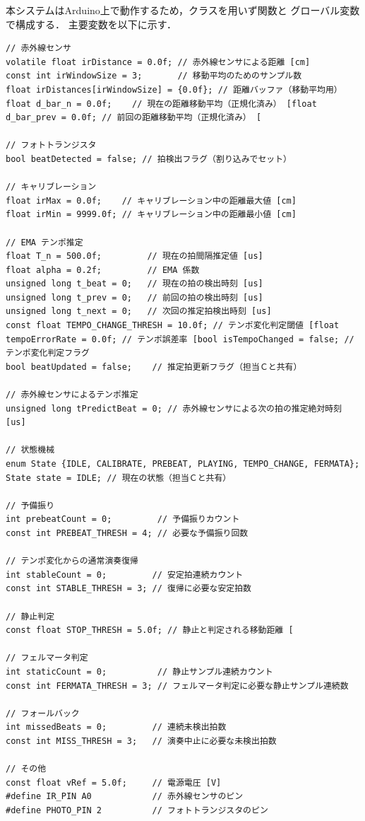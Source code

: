 \documentclass[lualatex,book,paper=a4paper,jafontsize=11.5pt,jafontscale=1.05,oneside]{jlreq}
\begin{document}
本システムはArduino上で動作するため，クラスを用いず関数と
グローバル変数で構成する．
主要変数を以下に示す．

\begin{lstlisting}[caption=担当 B 主要変数]
// 赤外線センサ
volatile float irDistance = 0.0f; // 赤外線センサによる距離 [cm]
const int irWindowSize = 3;       // 移動平均のためのサンプル数
float irDistances[irWindowSize] = {0.0f}; // 距離バッファ（移動平均用）
float d_bar_n = 0.0f;    // 現在の距離移動平均（正規化済み） [float d_bar_prev = 0.0f; // 前回の距離移動平均（正規化済み） [

// フォトトランジスタ
bool beatDetected = false; // 拍検出フラグ（割り込みでセット）

// キャリブレーション
float irMax = 0.0f;    // キャリブレーション中の距離最大値 [cm]
float irMin = 9999.0f; // キャリブレーション中の距離最小値 [cm]

// EMA テンポ推定
float T_n = 500.0f;         // 現在の拍間隔推定値 [us]
float alpha = 0.2f;         // EMA 係数
unsigned long t_beat = 0;   // 現在の拍の検出時刻 [us]
unsigned long t_prev = 0;   // 前回の拍の検出時刻 [us]
unsigned long t_next = 0;   // 次回の推定拍検出時刻 [us]
const float TEMPO_CHANGE_THRESH = 10.0f; // テンポ変化判定閾値 [float tempoErrorRate = 0.0f; // テンポ誤差率 [bool isTempoChanged = false; // テンポ変化判定フラグ
bool beatUpdated = false;    // 推定拍更新フラグ（担当Ｃと共有）

// 赤外線センサによるテンポ推定
unsigned long tPredictBeat = 0; // 赤外線センサによる次の拍の推定絶対時刻 [us]

// 状態機械
enum State {IDLE, CALIBRATE, PREBEAT, PLAYING, TEMPO_CHANGE, FERMATA};
State state = IDLE; // 現在の状態（担当Ｃと共有）

// 予備振り
int prebeatCount = 0;         // 予備振りカウント
const int PREBEAT_THRESH = 4; // 必要な予備振り回数

// テンポ変化からの通常演奏復帰
int stableCount = 0;         // 安定拍連続カウント
const int STABLE_THRESH = 3; // 復帰に必要な安定拍数

// 静止判定
const float STOP_THRESH = 5.0f; // 静止と判定される移動距離 [

// フェルマータ判定
int staticCount = 0;          // 静止サンプル連続カウント
const int FERMATA_THRESH = 3; // フェルマータ判定に必要な静止サンプル連続数

// フォールバック
int missedBeats = 0;         // 連続未検出拍数
const int MISS_THRESH = 3;   // 演奏中止に必要な未検出拍数

// その他
const float vRef = 5.0f;     // 電源電圧 [V]
#define IR_PIN A0            // 赤外線センサのピン
#define PHOTO_PIN 2          // フォトトランジスタのピン
\end{lstlisting}
\end{document}
